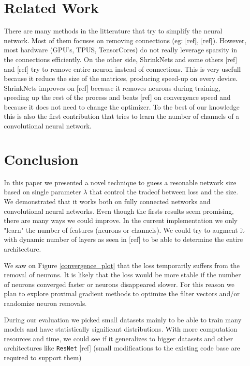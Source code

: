 \documentclass[sigconf]{acmart}
\begin{document}
\section{Related Work}

\par There are many methods in the litterature that try to simplify the neural
network. Most of them focuses on removing connections (eg: [ref], [ref]).
However, most hardware (GPU's, TPUS, TensorCores) do not really leverage sparsity
in the connections efficiently. On the other side, ShrinkNets and some others [ref]
and [ref] try to remove entire neuron instead of connections. This is very
usefull because it reduce the size of the matrices, producing speed-up on
every device. ShrinkNets improves on [ref] because it removes neurons during
training, speeding up the rest of the process and beats [ref] on convergence
speed and because it does not need to change the optimizer. To the best of our
knowledge this is also the first contribution that tries to learn the number of
channels of a convolutional neural network.

\section{Conclusion}

In this paper we presented a novel technique to guess a resonable network size
based on single parameter $\lambda$ that control the tradeof between loss and
the size. We demonstrated that it works both on fully connected networks and
convolutional neural networks.  Even though the firsts results seem promising,
there are many ways we could improve. In the current
implementation we only "learn" the number of features (neurons or channels). We
could try to augment it with dynamic number of layers as seen in [ref] to be
able to determine the entire architecture. \par We saw on Figure
\ref{convergence_plot} that the loss temporarily suffers from the removal of
neurons. It is likely that the loss would be more stable if the number of
neurons converged faster or neurons disappeared slower. For this reason we plan
to explore proximal gradient methods to optimize the filter vectors and/or
randomize neuron removals. \par During our evaluation we picked small datasets
mainly to be able to train many models and have statistically significant
distributions. With more computation resources and time, we could see if it
generalizes to bigger datasets and other architectures like \texttt{ResNet}
[ref] (small modifications to the existing code base are required to support
them)



\end{document}
